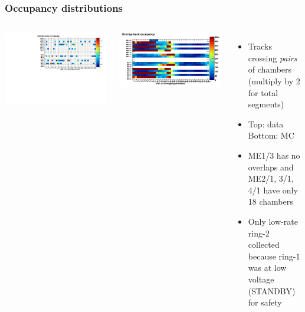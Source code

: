 \documentclass[compress]{beamer}
\begin{document}
\begin{frame}
\frametitle{Occupancy distributions}

\begin{columns}
\includegraphics[width=\linewidth]{REAL_occupancy1.pdf}

\includegraphics[width=\linewidth]{MCBeamHalo_occupancy1.pdf}

\begin{itemize}
\item Tracks crossing {\it pairs} of chambers (multiply by 2 for total segments)

\item Top: data \\ Bottom: MC

\item ME1/3 has no overlaps and ME2/1, 3/1, 4/1 have only 18 chambers

\item Only low-rate ring-2 collected because ring-1 was at low voltage {\scriptsize (STANDBY)} for safety

\end{itemize}
\end{columns}
\end{frame}
\end{document}
